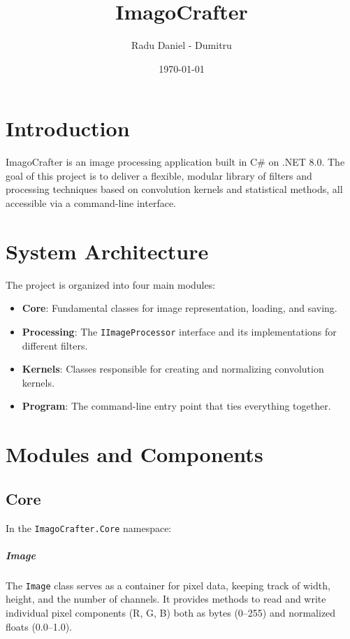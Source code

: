 \documentclass[12pt,a4paper]{report}
\title{ImagoCrafter}
\author{Radu Daniel - Dumitru}
\date{\today}
\begin{document}
\maketitle

\clearpage
\tableofcontents
\clearpage

\chapter{Introduction}
ImagoCrafter is an image processing application built in C\# on .NET 8.0. The goal of this project is to deliver a flexible, modular library of filters and processing techniques based on convolution kernels and statistical methods, all accessible via a command-line interface.

\chapter{System Architecture}
The project is organized into four main modules:
\begin{itemize}
  \item \textbf{Core}: Fundamental classes for image representation, loading, and saving.
  \item \textbf{Processing}: The \texttt{IImageProcessor} interface and its implementations for different filters.
  \item \textbf{Kernels}: Classes responsible for creating and normalizing convolution kernels.
  \item \textbf{Program}: The command-line entry point that ties everything together.
\end{itemize}

\chapter{Modules and Components}

\section{Core}
In the \texttt{ImagoCrafter.Core} namespace:

\paragraph{Image}
The \texttt{Image} class serves as a container for pixel data, keeping track of width, height, and the number of channels. It provides methods to read and write individual pixel components (R, G, B) both as bytes (0–255) and normalized floats (0.0–1.0).
\end{document}
